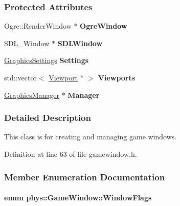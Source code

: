 \subsubsection*{Protected Attributes}
\begin{DoxyCompactItemize}
\item 
\hypertarget{classphys_1_1GameWindow_a0d8246623e8eec745b03f029215b2a6b}{
Ogre::RenderWindow $\ast$ {\bfseries OgreWindow}}
\label{classphys_1_1GameWindow_a0d8246623e8eec745b03f029215b2a6b}

\item 
\hypertarget{classphys_1_1GameWindow_aa1d07338b6b6fd40b2fc7b6c813d721e}{
SDL\_\-Window $\ast$ {\bfseries SDLWindow}}
\label{classphys_1_1GameWindow_aa1d07338b6b6fd40b2fc7b6c813d721e}

\item 
\hypertarget{classphys_1_1GameWindow_a1dba5999dd50a73b46b7aa0f53e7e529}{
\hyperlink{structphys_1_1GraphicsSettings}{GraphicsSettings} {\bfseries Settings}}
\label{classphys_1_1GameWindow_a1dba5999dd50a73b46b7aa0f53e7e529}

\item 
\hypertarget{classphys_1_1GameWindow_a64b3471c627e82f4f66eb25d1db2893a}{
std::vector$<$ \hyperlink{classphys_1_1Viewport}{Viewport} $\ast$ $>$ {\bfseries Viewports}}
\label{classphys_1_1GameWindow_a64b3471c627e82f4f66eb25d1db2893a}

\item 
\hypertarget{classphys_1_1GameWindow_aace5dc5e9cf498b22b9a905af66a7a4f}{
\hyperlink{classphys_1_1GraphicsManager}{GraphicsManager} $\ast$ {\bfseries Manager}}
\label{classphys_1_1GameWindow_aace5dc5e9cf498b22b9a905af66a7a4f}

\end{DoxyCompactItemize}


\subsubsection{Detailed Description}
This class is for creating and managing game windows. 

Definition at line 63 of file gamewindow.h.



\subsubsection{Member Enumeration Documentation}
\hypertarget{classphys_1_1GameWindow_ae4c6f1cc436ac9f20e43bd21a99885f5}{
\paragraph[{WindowFlags}]{\setlength{\rightskip}{0pt plus 5cm}enum {\bf phys::GameWindow::WindowFlags}}\hfill}
\label{classphys_1_1GameWindow_ae4c6f1cc436ac9f20e43bd21a99885f5}


